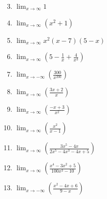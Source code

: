 \documentclass[12pt]{article}
\newif\ifans
\begin{document}
\begin{enumerate}
\setcounter{enumi}{2}

\item $\displaystyle \lim_{x\rightarrow \infty}{1}$

\ifans{\fbox{1}} \fi

\item $\displaystyle \lim_{x\rightarrow \infty}{\left(x^2+1\right)}$ 

\ifans{\fbox{$+\infty$}} \fi

\item $\displaystyle \lim_{x \rightarrow \infty}{x^2(x-7)(5-x)}$

\ifans{\fbox{$-\infty$}} \fi

\item $\displaystyle \lim_{x\rightarrow \infty}{\left(5-\frac{1}{x}+\frac{4}{x^3}\right)}$

\ifans{\fbox{5}} \fi

\item $\displaystyle \lim_{x\rightarrow -\infty}{\left(\frac{300}{x^{200}}\right)}$

\ifans{\fbox{0}} \fi

\item  $\displaystyle \lim_{x\rightarrow \infty}{\left(\frac{3x+2}{x}\right)}$ 

\ifans{\fbox{3}} \fi

\item  $\displaystyle \lim_{x\rightarrow \infty}{\left(\frac{-x+3}{x^2}\right)}$

\ifans{\fbox{0}} \fi

\item  $\displaystyle \lim_{x\rightarrow \infty}{\left(\frac{x^2}{x-1}\right)}$

\ifans{\fbox{$+\infty$}} \fi

\item  $\displaystyle \lim_{x\rightarrow \infty}{\left(\frac{3x^5-4x}{2x^5-4x^3-4x+5}\right)}$

\ifans{\fbox{$\displaystyle \frac{3}{2}$}} \fi

\item  $\displaystyle \lim_{x\rightarrow \infty}{\left(\frac{x^4-3x^2+5}{100x^3-10}\right)}$

\ifans{\fbox{$+\infty$}} \fi

\item  $\displaystyle \lim_{x\rightarrow -\infty}{\left(\frac{x^2-4x+6}{9-x}\right)}$

\ifans{\fbox{$+\infty$}} \fi


\end{enumerate}
\end{document}
